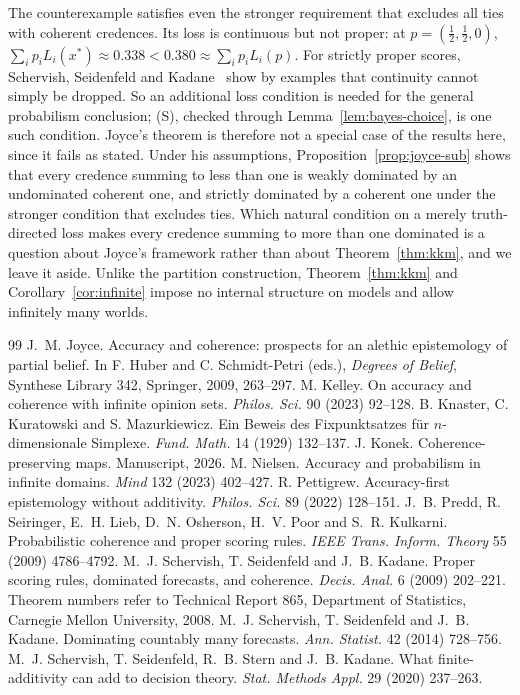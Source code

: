 \documentclass[11pt]{article}
\theoremstyle{definition}
\theoremstyle{remark}
\begin{document}
The counterexample satisfies even the stronger requirement that excludes all ties with coherent credences. Its loss is continuous but not proper: at $p=(\tfrac12,\tfrac12,0)$, $\sum_ip_iL_i(x^*)\approx0.338<0.380\approx\sum_ip_iL_i(p)$. For strictly proper scores, Schervish, Seidenfeld and Kadane~\cite{SSK09} show by examples that continuity cannot simply be dropped. So an additional loss condition is needed for the general probabilism conclusion; (S), checked through Lemma~\ref{lem:bayes-choice}, is one such condition. Joyce's theorem is therefore not a special case of the results here, since it fails as stated. Under his assumptions, Proposition~\ref{prop:joyce-sub} shows that every credence summing to less than one is weakly dominated by an undominated coherent one, and strictly dominated by a coherent one under the stronger condition that excludes ties. Which natural condition on a merely truth-directed loss makes every credence summing to more than one dominated is a question about Joyce's framework rather than about Theorem~\ref{thm:kkm}, and we leave it aside. Unlike the partition construction, Theorem~\ref{thm:kkm} and Corollary~\ref{cor:infinite} impose no internal structure on models and allow infinitely many worlds.


\begin{thebibliography}{99}
 J.~M. Joyce. Accuracy and coherence: prospects for an alethic epistemology of partial belief. In F. Huber and C. Schmidt-Petri (eds.), \emph{Degrees of Belief}, Synthese Library 342, Springer, 2009, 263--297.
 M. Kelley. On accuracy and coherence with infinite opinion sets. \emph{Philos. Sci.} 90 (2023) 92--128.
 B. Knaster, C. Kuratowski and S. Mazurkiewicz. Ein Beweis des Fixpunktsatzes f\"ur $n$-dimensionale Simplexe. \emph{Fund. Math.} 14 (1929) 132--137.
 J. Konek. Coherence-preserving maps. Manuscript, 2026.
 M. Nielsen. Accuracy and probabilism in infinite domains. \emph{Mind} 132 (2023) 402--427.
 R. Pettigrew. Accuracy-first epistemology without additivity. \emph{Philos. Sci.} 89 (2022) 128--151.
 J.~B. Predd, R. Seiringer, E.~H. Lieb, D.~N. Osherson, H.~V. Poor and S.~R. Kulkarni. Probabilistic coherence and proper scoring rules. \emph{IEEE Trans. Inform. Theory} 55 (2009) 4786--4792.
 M.~J. Schervish, T. Seidenfeld and J.~B. Kadane. Proper scoring rules, dominated forecasts, and coherence. \emph{Decis. Anal.} 6 (2009) 202--221. Theorem numbers refer to Technical Report 865, Department of Statistics, Carnegie Mellon University, 2008.
 M.~J. Schervish, T. Seidenfeld and J.~B. Kadane. Dominating countably many forecasts. \emph{Ann. Statist.} 42 (2014) 728--756.
 M.~J. Schervish, T. Seidenfeld, R.~B. Stern and J.~B. Kadane. What finite-additivity can add to decision theory. \emph{Stat. Methods Appl.} 29 (2020) 237--263.
\end{thebibliography}
\end{document}
